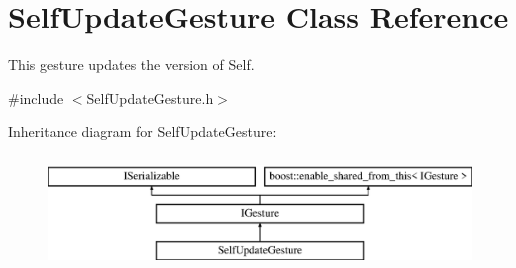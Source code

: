 \hypertarget{class_self_update_gesture}{}\section{Self\+Update\+Gesture Class Reference}
\label{class_self_update_gesture}


This gesture updates the version of Self.  




{\ttfamily \#include $<$Self\+Update\+Gesture.\+h$>$}

Inheritance diagram for Self\+Update\+Gesture\+:\begin{figure}[H]
\begin{center}
\leavevmode
\includegraphics[height=3.000000cm]{class_self_update_gesture}
\end{center}
\end{figure}

